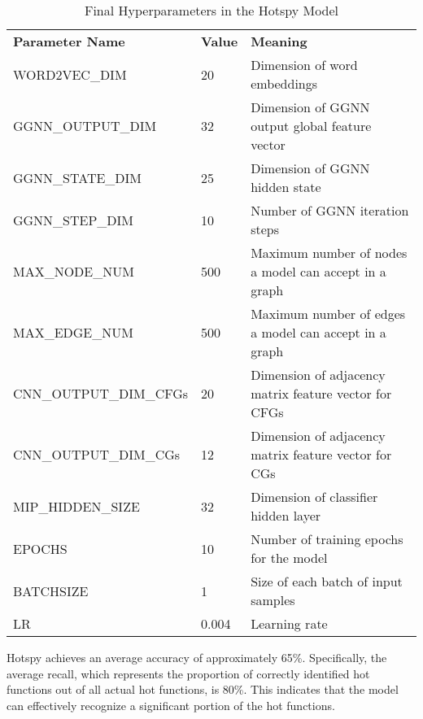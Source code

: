 \documentclass[lineno,sn-mathphys]{sn-jnl}%
\theoremstyle{thmstyleone}%
\theoremstyle{thmstyletwo}%
\theoremstyle{thmstylethree}%
\begin{document}
 \begin{table*}[ht]
     \centering
     \caption{Final Hyperparameters in the Hotspy Model}
     \label{tab:hyperparameters}
     \begin{tabular}{@{}lll@{}}
     \hline
     \textbf{Parameter Name}      & \textbf{Value} & \textbf{Meaning} \\ 
     WORD2VEC\_DIM                & 20                     & Dimension of word embeddings \\
     GGNN\_OUTPUT\_DIM            & 32                     & Dimension of GGNN output global feature vector \\
     GGNN\_STATE\_DIM             & 25                     & Dimension of GGNN hidden state \\
     GGNN\_STEP\_DIM              & 10                     & Number of GGNN iteration steps \\
     MAX\_NODE\_NUM               & 500                    & Maximum number of nodes a model can accept in a graph \\
     MAX\_EDGE\_NUM               & 500                    & Maximum number of edges a model can accept in a graph \\
     CNN\_OUTPUT\_DIM\_CFGs       & 20                     & Dimension of adjacency matrix feature vector for CFGs \\
     CNN\_OUTPUT\_DIM\_CGs        & 12                     & Dimension of adjacency matrix feature vector for CGs \\
     MIP\_HIDDEN\_SIZE            & 32                     & Dimension of classifier hidden layer \\
     EPOCHS                       & 10                     & Number of training epochs for the model \\
     BATCHSIZE                    & 1                      & Size of each batch of input samples \\
     LR                           & 0.004                  & Learning rate \\
     \hline
     \end{tabular}
 \end{table*}
 Hotspy achieves an average accuracy of approximately 65\%. Specifically, the average recall, which represents the proportion of correctly identified hot functions out of all actual hot functions, is 80\%. This indicates that the model can effectively recognize a significant portion of the hot functions.
\end{document}
